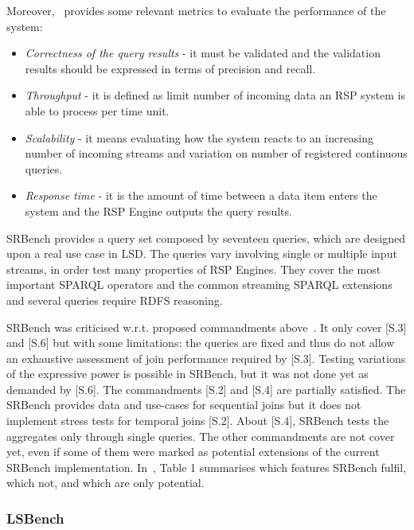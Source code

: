 Moreover,~\cite{Zhang2012} provides some relevant metrics to evaluate the performance of the system: 
\begin{itemize}
\item \textit{Correctness of the query results} - it must be validated and the validation results should be expressed in terms of precision and recall.
\item \textit{Throughput} - it is defined as limit number of incoming data an RSP system is able to process per time unit.
\item \textit{Scalability} - it means evaluating how the system reacts to an increasing number of incoming streams and variation on number of registered continuous queries.
\item \textit{Response time} - it is the amount of time between a data item enters the system and the RSP Engine outputs the query results.
\end{itemize}

SRBench provides a query set composed by seventeen queries, which are designed upon a real use case in LSD. The queries vary involving single or multiple input streams, in order test many properties of RSP Engines. They cover the most important SPARQL operators and the common streaming SPARQL extensions and several queries require RDFS reasoning.

SRBench was criticised w.r.t. proposed commandments above~\cite{DBLP:conf/esws/ScharrenbachUMVB13}. It only cover [S.3] and [S.6] but with some limitations: the queries are fixed and thus do not allow an exhaustive assessment of join performance required by [S.3]. Testing variations of the expressive power is possible in SRBench, but it was not done yet as demanded by [S.6]. The commandments [S.2] and [S.4] are partially satisfied. The SRBench provides data and use-cases for sequential joins but it does not implement stress tests for temporal joins [S.2]. About [S.4], SRBench tests the aggregates only through single queries. The other commandments are not cover yet, even if some of them were marked as potential extensions of the current SRBench implementation. In~\cite{DBLP:conf/esws/ScharrenbachUMVB13}, Table 1 summarises which features SRBench fulfil, which not, and which are only potential.

\subsubsection{LSBench}\label{sec:lsbench}

